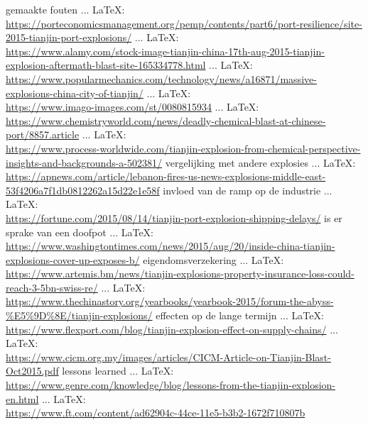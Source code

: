 \begin{thebibliography}{99}
gemaakte fouten
 ... \LaTeX:\\ \url{https://porteconomicsmanagement.org/pemp/contents/part6/port-resilience/site-2015-tianjin-port-explosions/}
 ... \LaTeX:\\ \url{https://www.alamy.com/stock-image-tianjin-china-17th-aug-2015-tianjin-explosion-aftermath-blast-site-165334778.html}
 ... \LaTeX:\\ \url{https://www.popularmechanics.com/technology/news/a16871/massive-explosions-china-city-of-tianjin/}
 ... \LaTeX:\\ \url{https://www.imago-images.com/st/0080815934}
 ... \LaTeX:\\ \url{https://www.chemistryworld.com/news/deadly-chemical-blast-at-chinese-port/8857.article}
 ... \LaTeX:\\ \url{https://www.process-worldwide.com/tianjin-explosion-from-chemical-perspective-insights-and-backgrounds-a-502381/}
vergelijking met andere explosies
 ... \LaTeX:\\ \url{https://apnews.com/article/lebanon-fires-us-news-explosions-middle-east-53f4206a7f1db0812262a15d22e1e58f}
invloed van de ramp op de industrie
 ... \LaTeX:\\ \url{https://fortune.com/2015/08/14/tianjin-port-explosion-shipping-delays/}
is er sprake van een doofpot
 ... \LaTeX:\\ \url{https://www.washingtontimes.com/news/2015/aug/20/inside-china-tianjin-explosions-cover-up-exposes-b/}
eigendomsverzekering
 ... \LaTeX:\\ \url{https://www.artemis.bm/news/tianjin-explosions-property-insurance-loss-could-reach-3-5bn-swiss-re/}
 ... \LaTeX:\\ \url{https://www.thechinastory.org/yearbooks/yearbook-2015/forum-the-abyss-%E5%9D%8E/tianjin-explosions/}
effecten op de lange termijn
 ... \LaTeX:\\ \url{https://www.flexport.com/blog/tianjin-explosion-effect-on-supply-chains/}
 ... \LaTeX:\\ \url{https://www.cicm.org.my/images/articles/CICM-Article-on-Tianjin-Blast-Oct2015.pdf}
lessons learned
 ... \LaTeX:\\ \url{https://www.genre.com/knowledge/blog/lessons-from-the-tianjin-explosion-en.html}
 ... \LaTeX:\\ \url{https://www.ft.com/content/ad62904c-44ce-11e5-b3b2-1672f710807b}

\end{thebibliography}
